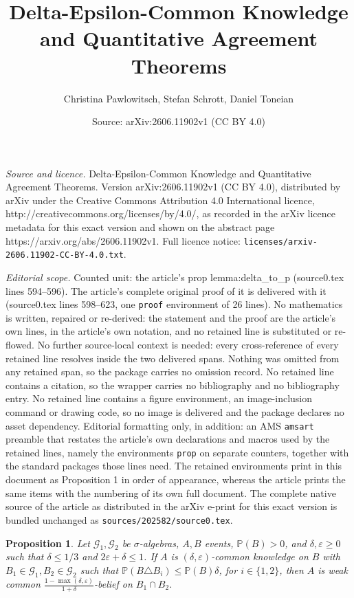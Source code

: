 \documentclass[10pt,a4paper]{amsart}
\title{Delta-Epsilon-Common Knowledge and Quantitative Agreement Theorems}
\author{Christina Pawlowitsch, Stefan Schrott, Daniel Toneian}
\date{Source: arXiv:2606.11902v1 (CC BY 4.0)}
\newtheorem{prop}{Proposition}
\newcommand{\G}{\mathcal{G}}
\renewcommand{\P}{\mathbb{P}}
\renewcommand{\epsilon}{\varepsilon}
\begin{document}
\maketitle

\noindent\emph{Source and licence.} Delta-Epsilon-Common Knowledge and Quantitative Agreement Theorems. Version arXiv:2606.11902v1 (CC BY 4.0), distributed by arXiv under the Creative Commons Attribution 4.0 International licence, http://creativecommons.org/licenses/by/4.0/, as recorded in the arXiv licence metadata for this exact version and shown on the abstract page https://arxiv.org/abs/2606.11902v1. Full licence notice: \texttt{licenses/arxiv-2606.11902-CC-BY-4.0.txt}.\par\smallskip

\noindent\textit{Editorial scope.} Counted unit: the article's prop lemma:delta\_to\_p (source0.tex lines 594--596). The article's complete original proof of it is delivered with it (source0.tex lines 598--623, one \texttt{proof} environment of 26 lines). No mathematics is written, repaired or re-derived: the statement and the proof are the article's own lines, in the article's own notation, and no retained line is substituted or re-flowed.  No further source-local context is needed: every cross-reference of every retained line resolves inside the two delivered spans.  Nothing was omitted from any retained span, so the package carries no omission record.  No retained line contains a citation, so the wrapper carries no bibliography and no bibliography entry.  No retained line contains a figure environment, an image-inclusion command or drawing code, so no image is delivered and the package declares no asset dependency.  Editorial formatting only, in addition: an AMS \texttt{amsart} preamble that restates the article's own declarations and macros used by the retained lines, namely the environments \texttt{prop} on separate counters, together with the standard packages those lines need.  The retained environments print in this document as Proposition 1 in order of appearance, whereas the article prints the same items with the numbering of its own full document.  The complete native source of the article as distributed in the arXiv e-print for this exact version is bundled unchanged as \texttt{sources/202582/source0.tex}.
\begin{prop}\label{lemma:delta_to_p}
	Let $\G_1,\G_2$ be $\sigma$-algebras, $A,B$ events, $\P(B)>0$, and $\delta,\epsilon \geq 0$ such that $\delta \leq 1/3$ and $2\epsilon + \delta \leq 1$. If $A$ is $(\delta, \epsilon)$-common knowledge on $B$ with $B_1 \in \G_1, B_2 \in \G_2$ such that $\P(B \triangle B_i) \leq \P(B) \delta$, for $i \in \{1,2\}$, then $A$ is weak common $\frac{1-\max(\delta,\epsilon)}{1+\delta}$-belief on  $B_1 \cap B_2$.
\end{prop}
\end{document}
